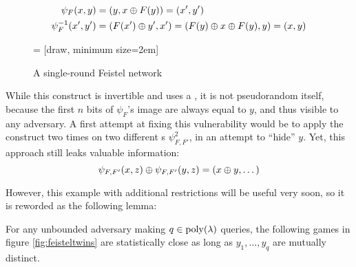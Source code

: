 \begin{align*}
    \psi_F(x, y) &= (y, x \oplus F(y)) = (x', y') \\
    \psi^{-1}_F(x', y') &= (F(x') \oplus y', x') = (F(y) \oplus x \oplus F(y), y) = (x, y)
\end{align*}

\begin{figure}[ht]
    \centering
    
      = [draw, minimum size=2em]

    
    \label{fig:feistel}
    \caption{A single-round Feistel network}
\end{figure}

While this construct is invertible and uses a \prf{}, it is not pseudorandom itself, because the first $n$ bits of $\psi_{F}$'s image are always equal to $y$, and thus visible to any adversary. A first attempt at fixing this vulnerability would be to apply the construct two times on two different \prf{}s $\psi^2_{F, F'}$, in an attempt to ``hide'' $y$. Yet, this approach still leaks valuable information:
\[
    \psi_{F, F'}(x, z) \oplus \psi_{F, F'}(y, z) = (x \oplus y, \dots)
\]

However, this example with additional restrictions will be useful very soon, so it is reworded as the following lemma:

\begin{lemma}
    For any unbounded adversary making $q \in \mathrm{poly}(\lambda)$ queries, the following games in figure \ref{fig:feisteltwins} are statistically close as long as $y_1, \ldots, y_q$ are mutually distinct.
\end{lemma}

